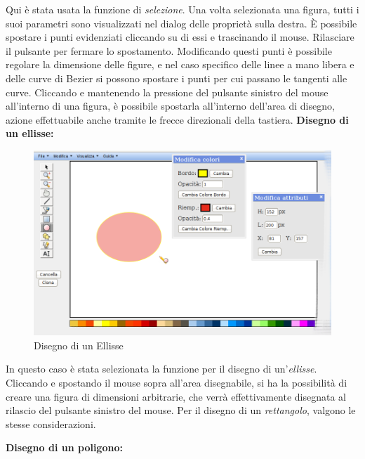 Qui \`e stata usata la funzione di \textit{selezione}. Una volta selezionata una figura, tutti i suoi parametri sono visualizzati nel dialog delle propriet\` a sulla destra. \`E possibile spostare i punti evidenziati cliccando su di essi e trascinando il mouse. Rilasciare il pulsante per fermare lo spostamento. Modificando questi punti \`e possibile regolare la dimensione delle figure, e nel caso specifico delle linee a mano libera e delle curve di Bezier si possono spostare i punti per cui passano le tangenti alle curve. Cliccando e mantenendo la pressione del pulsante sinistro del mouse all'interno di una figura, \`e possibile spostarla all'interno dell'area di disegno, azione effettuabile anche tramite le frecce direzionali della tastiera.
 \newpage
 \textbf{Disegno di un ellisse:}\\
\begin{figure}[!ht]
\centering
\includegraphics[scale=0.5]{images/ellisse.png}
\caption{Disegno di un Ellisse}
\end{figure}
 
\vspace{50pt}
In questo caso \`e stata selezionata la funzione per il disegno di un'\textit{ellisse}. Cliccando e spostando il mouse sopra all'area disegnabile, si ha la possibilit\` a di creare una figura di dimensioni arbitrarie, che verr\` a effettivamente disegnata al rilascio del pulsante sinistro del mouse. Per il disegno di un \textit{rettangolo}, valgono le stesse considerazioni.
\newpage


\textbf{Disegno di un poligono:}\\
 
